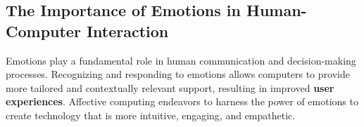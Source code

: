 \subsection{The Importance of Emotions in Human-Computer Interaction}
Emotions play a fundamental role in human communication and decision-making processes. 
Recognizing and responding to emotions allows computers to provide more tailored and contextually relevant support, resulting in improved \textbf{user experiences}. 
Affective computing endeavors to harness the power of emotions to create technology that is more intuitive, engaging, and empathetic.